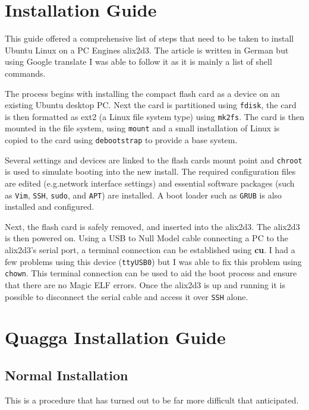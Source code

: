 \section{Installation Guide}

 This guide\cite{germanGuide} offered a comprehensive list of steps that need to
 be taken to install Ubuntu Linux on a PC Engines alix2d3\cite{alix2d3}.  The article is
 written in German but using Google translate I was able to follow it as it is
 mainly a list of shell commands.

 The process begins with installing the compact flash card as a device on an
 existing Ubuntu desktop PC\@. Next the card is partitioned using \texttt{fdisk},
 the card is then formatted as ext2 (a Linux file system type) using
 \texttt{mk2fs}. The card is then mounted in the file system, using
 \texttt{mount} and a small installation of Linux is copied to the card using
 \texttt{debootstrap} to provide a base system.

 Several settings and devices are linked to the flash cards mount point and
 \texttt{chroot} is used to simulate booting into the new install. The required
 configuration files are edited (e.g.\@ network interface settings) and essential
 software packages (such as \texttt{Vim}, \texttt{SSH}, \texttt{sudo}, and
 \texttt{APT}) are installed. A boot loader such as \texttt{GRUB} is also
 installed and configured.

 Next, the flash card is safely removed, and  inserted into the alix2d3. The
 alix2d3 is then powered on. Using a USB to Null Model cable connecting a PC to
 the alix2d3's serial port, a terminal connection can be established using {\bf
 cu}. I had a few problems using this device (\texttt{ttyUSB0}) but I was able to
 fix this problem using \texttt{chown}. This terminal connection can be used to
 aid the boot process and ensure that there are no Magic ELF errors. Once the
 alix2d3 is up and running it is possible to disconnect the serial cable and
 access it over \texttt{SSH} alone.

 \section{Quagga Installation Guide}

 \subsection{Normal Installation}
This is a procedure that has  turned out to be far more difficult that anticipated.

